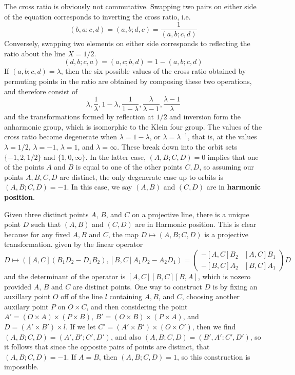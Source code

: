 The cross ratio is obviously not commutative. Swapping two pairs on either side of the equation corresponds to inverting the cross ratio, i.e.
%
\[ (b,a;c,d) = (a,b;d,c) = \frac{1}{(a,b;c,d)} \]
%
Conversely, swapping two elements on either side corresponds to reflecting the ratio about the line $X = 1/2$.
%
\[ (d,b;c,a) = (a,c;b,d) = 1 - (a,b;c,d) \]
%
If $(a,b;c,d) = \lambda$, then the six possible values of the cross ratio obtained by permuting points in the ratio are obtained by composing these two operations, and therefore consist of
%
\[ \lambda, \frac{1}{\lambda}, 1 - \lambda, \frac{1}{1 - \lambda}, \frac{\lambda}{\lambda - 1}, \frac{\lambda - 1}{\lambda} \]
%
and the transformations formed by reflection at $1/2$ and inversion form the anharmonic group, which is isomorphic to the Klein four group. The values of the cross ratio become degenerate when $\lambda = 1 - \lambda$, or $\lambda = \lambda^{-1}$, that is, at the values $\lambda = 1/2$, $\lambda = -1$, $\lambda = 1$, and $\lambda = \infty$. These break down into the orbit sets $\{ -1, 2, 1/2 \}$ and $\{ 1, 0, \infty \}$. In the latter case, $(A,B;C,D) = 0$ implies that one of the points $A$ and $B$ is equal to one of the other points $C,D$, so assuming our points $A,B,C,D$ are distinct, the only degenerate case up to orbits is $(A,B;C,D) = -1$. In this case, we say $(A,B)$ and $(C,D)$ are in {\bf harmonic position}.

Given three distinct points $A$, $B$, and $C$ on a projective line, there is a unique point $D$ such that $(A,B)$ and $(C,D)$ are in Harmonic position. This is clear because for any fixed $A,B$ and $C$, the map $D \mapsto (A,B;C,D)$ is a projective transformation. given by the linear operator
%
\[ D \mapsto ([A,C](B_1D_2 - D_1B_2), [B,C] A_1D_2 - A_2D_1) = \begin{pmatrix} -[A,C]B_2 & [A,C]B_1 \\ -[B,C]A_2 & [B,C]A_1 \end{pmatrix} D \]
%
and the determinant of the operator is $[A,C][B,C][B,A]$, which is nozero provided $A$, $B$ and $C$ are distinct points. One way to construct $D$ is by fixing an auxillary point $O$ off of the line $l$ containing $A,B$, and $C$, choosing another auxilary point $P$ on $O \times C$, and then considering the point $A' = (O \times A) \times (P \times B)$, $B' = (O \times B) \times (P \times A)$, and $D = (A' \times B') \times l$. If we let $C' = (A' \times B') \times (O \times C')$, then we find $(A,B;C,D) = (A',B';C',D')$, and also $(A,B;C,D) = (B',A':C',D')$, so it follows that since the opposite pairs of points are distinct, that $(A,B;C,D) = -1$. If $A = B$, then $(A,B;C,D) = 1$, so this construction is impossible.

